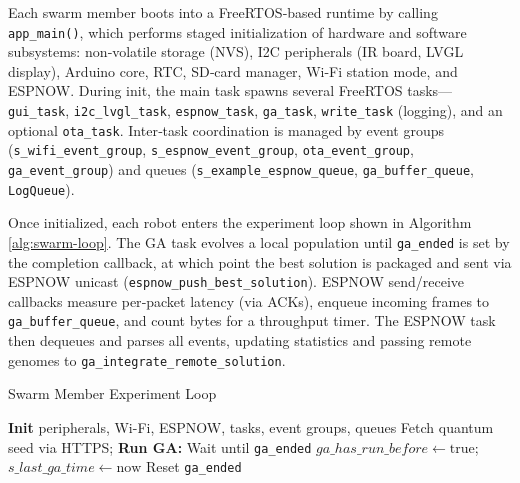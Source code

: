 \documentclass{report}
\begin{document}
Each swarm member boots into a FreeRTOS‐based runtime by calling \texttt{app\_main()}, which performs staged initialization of hardware and software subsystems: non‐volatile storage (NVS), I2C peripherals (IR board, LVGL display), Arduino core, RTC, SD‐card manager, Wi-Fi station mode, and ESPNOW. During init, the main task spawns several FreeRTOS tasks—\texttt{gui\_task}, \texttt{i2c\_lvgl\_task}, \texttt{espnow\_task}, \texttt{ga\_task}, \texttt{write\_task} (logging), and an optional \texttt{ota\_task}. Inter‐task coordination is managed by event groups (\texttt{s\_wifi\_event\_group}, \texttt{s\_espnow\_event\_group}, \texttt{ota\_event\_group}, \texttt{ga\_event\_group}) and queues (\texttt{s\_example\_espnow\_queue}, \texttt{ga\_buffer\_queue}, \texttt{LogQueue}).

Once initialized, each robot enters the experiment loop shown in Algorithm \ref{alg:swarm-loop}. The GA task evolves a local population until \texttt{ga\_ended} is set by the completion callback, at which point the best solution is packaged and sent via ESPNOW unicast (\texttt{espnow\_push\_best\_solution}). ESPNOW send/receive callbacks measure per‐packet latency (via ACKs), enqueue incoming frames to \texttt{ga\_buffer\_queue}, and count bytes for a throughput timer. The ESPNOW task then dequeues and parses all events, updating statistics and passing remote genomes to \texttt{ga\_integrate\_remote\_solution}. 

\begin{algorithm}[h]
\caption{Swarm Member Experiment Loop\label{alg:swarm-loop}}
\begin{algorithmic}[1]
  \State \textbf{Init} peripherals, Wi-Fi, ESPNOW, tasks, event groups, queues
  \State Fetch quantum seed via HTTPS; 
  \Loop
    \State \textbf{Run GA:} 
    \State Wait until \texttt{ga\_ended} 
    \State {}
    \State $ga\_has\_run\_before \gets \mathrm{true}$; $s\_last\_ga\_time \gets \mathrm{now}$
    \State {} 
      \State {}
    \EndFor
    \State {} 
    \State Reset \texttt{ga\_ended}
  \EndLoop
\end{algorithmic}
\end{algorithm}
\end{document}
